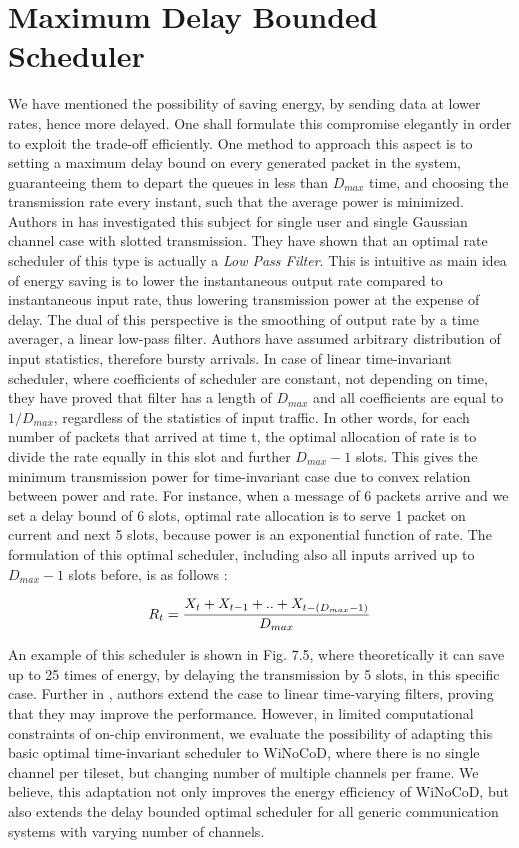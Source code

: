 \section{Maximum Delay Bounded Scheduler}

We have mentioned the possibility of saving energy, by sending data at lower rates, hence more delayed. One shall formulate this compromise elegantly in order to exploit the trade-off efficiently. One method to approach this aspect is to setting a maximum delay bound on every generated packet in the system, guaranteeing them to depart the queues in less than $D_{max}$ time, and choosing the transmission rate every instant, such that the average power is minimized. Authors in \cite{khojastepour2003power} has investigated this subject for single user and single Gaussian channel case with slotted transmission. They have shown that an optimal rate scheduler of this type is actually a \textit{Low Pass Filter}. This is intuitive as main idea of energy saving is to lower the instantaneous output rate compared to instantaneous input rate, thus lowering transmission power at the expense of delay. The dual of this perspective is the smoothing of output rate by a time averager, a linear low-pass filter. Authors have assumed arbitrary distribution of input statistics, therefore bursty arrivals. In case of linear time-invariant scheduler, where coefficients of scheduler are constant, not depending on time, they have proved that filter has a length of $D_{max}$ and all coefficients are equal to $1/D_{max}$, regardless of the statistics of input traffic. In other words, for each number of packets that arrived at time t, the optimal allocation of rate is to divide the rate equally in this slot and further $D_{max}-1$ slots. This gives the minimum transmission power for time-invariant case due to convex relation between power and rate. For instance, when a message of 6 packets arrive and we set a delay bound of 6 slots, optimal rate allocation is to serve 1 packet on current and next 5 slots, because power is an exponential function of rate. The formulation of this optimal scheduler, including also all inputs arrived up to $D_{max}-1$ slots before, is as follows :

\begin{align}
R_{t} = { {X_{t} +  X_{t-1} + .. + X_{t-(D_{max}-1)}}\over D_{max}} 
\end{align}

An example of this scheduler is shown in Fig. 7.5, where theoretically it can save up to 25 times of energy, by delaying the transmission by 5 slots, in this specific case. Further in \cite{khojastepour2004delay}, authors extend the case to linear time-varying filters, proving that they may improve the performance. However, in limited computational constraints of on-chip environment, we evaluate the possibility of adapting this basic optimal time-invariant scheduler to WiNoCoD, where there is no single channel per tileset, but changing number of multiple channels per frame. We believe, this adaptation not only improves the energy efficiency of WiNoCoD, but also extends the delay bounded optimal scheduler for all generic communication systems with varying number of channels.


